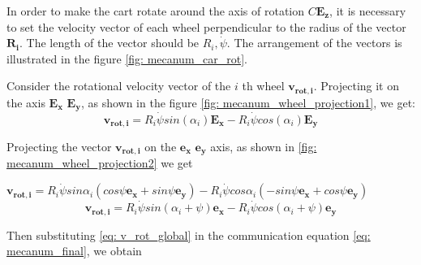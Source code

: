 \documentclass[oneside,final,14pt]{extreport}
\newcommand{\bs}{\boldsymbol}
\begin{document}
In order to make the cart rotate around the axis of rotation $ C \bs{E_{z}} $, it is necessary to set the velocity vector of each wheel perpendicular to the radius of the vector $ \bs{R_{i}} $. The length of the vector should be $ R_{i}, \dot{\psi} $. The arrangement of the vectors is illustrated in the figure \ref{fig: mecanum_car_rot}.

\begin{figure} [H]
\end{figure}

Consider the rotational velocity vector of the $ i $ th wheel $ \bs{v_{rot, i}} $. Projecting it on the axis $ \bs{E_{x}} $ $ \bs{E_{y}} $, as shown in the figure \ref{fig: mecanum_wheel_projection1}, we get:
\begin{equation}
\bs{v_{rot, i}}
=
R_{i}
\dot{\psi}
sin (\alpha_{i})
\bs{E_{x}}
-
R_{i}
\dot{\psi}
cos (\alpha_{i})
\bs{E_{y}}
\end{equation}

\begin{figure} [H]
\end{figure}

Projecting the vector $ \bs{v_{rot, i}} $ on the $ \bs{e_{x}} $ $ \bs{e_{y}} $ axis, as shown in \ref{fig: mecanum_wheel_projection2} we get

$
\bs{v_{rot, i}}
=
R_{i}
\dot{\psi}
sin \alpha_{i}
(
cos \psi \bs{e_{x}}
+
sin \psi \bs{e_{y}}
)
-
R_{i}
\dot{\psi}
cos \alpha_{i}
(
-sin \psi \bs{e_{x}}
+
cos \psi \bs{e_{y}}
)
$
\begin{equation}
\label{eq: v_rot_global}
\bs{v_{rot, i}}
=
R_{i}
\dot{\psi}
sin (\alpha_{i} + \psi)
\bs{e_{x}}
-
R_{i}
\dot{\psi}
cos (\alpha_{i} + \psi)
\bs{e_{y}}
\end{equation}

\begin{figure} [H]
\end{figure}

Then substituting \ref{eq: v_rot_global} in the communication equation \ref{eq: mecanum_final}, we obtain
\end{document}
